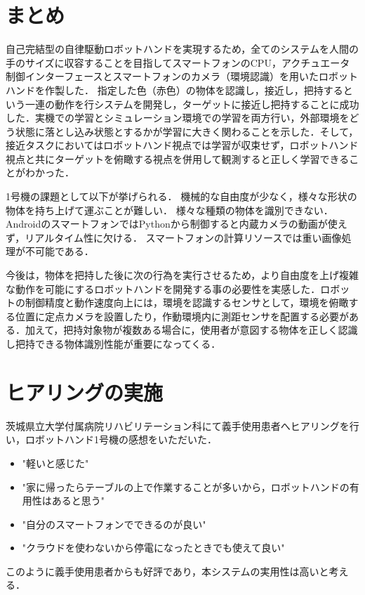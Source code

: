 \section{まとめ}
自己完結型の自律駆動ロボットハンドを実現するため，全てのシステムを人間の手のサイズに収容することを目指してスマートフォンのCPU，アクチュエータ制御インターフェースとスマートフォンのカメラ（環境認識）を用いたロボットハンドを作製した．
指定した色（赤色）の物体を認識し，接近し，把持するという一連の動作を行システムを開発し，ターゲットに接近し把持することに成功した．実機での学習とシミュレーション環境での学習を両方行い，外部環境をどう状態に落とし込み状態とするかが学習に大きく関わることを示した．そして，接近タスクにおいてはロボットハンド視点では学習が収束せず，ロボットハンド視点と共にターゲットを俯瞰する視点を併用して観測すると正しく学習できることがわかった．

1号機の課題として以下が挙げられる．
機械的な自由度が少なく，様々な形状の物体を持ち上げて運ぶことが難しい．
様々な種類の物体を識別できない．
AndroidのスマートフォンではPythonから制御すると内蔵カメラの動画が使えず，リアルタイム性に欠ける．
スマートフォンの計算リソースでは重い画像処理が不可能である．

今後は，物体を把持した後に次の行為を実行させるため，より自由度を上げ複雑な動作を可能にするロボットハンドを開発する事の必要性を実感した．ロボットの制御精度と動作速度向上には，環境を認識するセンサとして，環境を俯瞰する位置に定点カメラを設置したり，作動環境内に測距センサを配置する必要がある．加えて，把持対象物が複数ある場合に，使用者が意図する物体を正しく認識し把持できる物体識別性能が重要になってくる．


\section{ヒアリングの実施}
茨城県立大学付属病院リハビリテーション科にて義手使用患者へヒアリングを行い，ロボットハンド1号機の感想をいただいた．
\begin{itemize}
    \item "軽いと感じた"
    \item "家に帰ったらテーブルの上で作業することが多いから，ロボットハンドの有用性はあると思う"
    \item "自分のスマートフォンでできるのが良い"
    \item "クラウドを使わないから停電になったときでも使えて良い"
\end{itemize}
このように義手使用患者からも好評であり，本システムの実用性は高いと考える．
